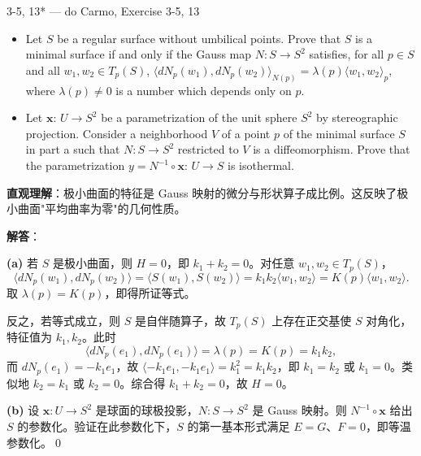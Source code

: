 \begin{exercise}{3-5, 13* — do Carmo, Exercise 3-5, 13}
\begin{itemize}
\item[a.] Let $S$ be a regular surface without umbilical points. Prove that $S$ is a minimal surface if and only if the Gauss map $N \colon S \to S^2$ satisfies, for all $p \in S$ and all $w_1, w_2 \in T_p(S)$, $\langle d N _ {p} (w _ {1}), d N _ {p} (w _ {2}) \rangle_ {N (p)} = \lambda (p) \langle w _ {1}, w _ {2} \rangle_ {p}$, where $\lambda(p) \neq 0$ is a number which depends only on $p$.
\item[b.] Let $\mathbf{x}$: $U\to S^2$ be a parametrization of the unit sphere $S^2$ by stereographic projection. Consider a neighborhood $V$ of a point $p$ of the minimal surface $S$ in part a such that $N\colon S\to S^2$ restricted to $V$ is a diffeomorphism. Prove that the parametrization $y = N^{-1}\circ \mathbf{x}$: $U\rightarrow S$ is isothermal.
\end{itemize}
\end{exercise}
\begin{solution}
\textbf{直观理解}：极小曲面的特征是 Gauss 映射的微分与形状算子成比例。这反映了极小曲面"平均曲率为零"的几何性质。

\textbf{解答}：

\textbf{(a)} 若 $S$ 是极小曲面，则 $H=0$，即 $k_1 + k_2 = 0$。对任意 $w_1, w_2 \in T_p(S)$，
\[
\langle dN_p(w_1), dN_p(w_2)\rangle = \langle S(w_1), S(w_2)\rangle = k_1k_2\langle w_1, w_2\rangle = K(p)\langle w_1, w_2\rangle.
\]
取 $\lambda(p) = K(p)$，即得所证等式。

反之，若等式成立，则 $S$ 是自伴随算子，故 $T_p(S)$ 上存在正交基使 $S$ 对角化，特征值为 $k_1, k_2$。此时
\[
\langle dN_p(e_1), dN_p(e_1)\rangle = \lambda(p) = K(p) = k_1k_2,
\]
而 $dN_p(e_1) = -k_1e_1$，故 $\langle -k_1e_1, -k_1e_1\rangle = k_1^2 = k_1k_2$，即 $k_1 = k_2$ 或 $k_1 = 0$。类似地 $k_2 = k_1$ 或 $k_2 = 0$。综合得 $k_1 + k_2 = 0$，故 $H=0$。

\textbf{(b)} 设 $\mathbf{x}: U\to S^2$ 是球面的球极投影，$N: S\to S^2$ 是 Gauss 映射。则 $N^{-1}\circ\mathbf{x}$ 给出 $S$ 的参数化。验证在此参数化下，$S$ 的第一基本形式满足 $E=G$、$F=0$，即等温参数化。\qed
\end{solution}

